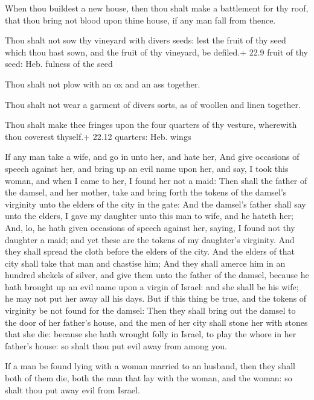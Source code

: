  When thou buildest a new house, then thou shalt make a
battlement for thy roof, that thou bring not blood upon thine house, if
any man fall from thence.

 Thou shalt not sow thy vineyard with divers seeds: lest
the fruit of thy seed which thou hast sown, and the fruit of thy
vineyard, be defiled.+ 22.9 fruit of thy seed: Heb. fulness of the seed

 Thou shalt not plow with an ox and an ass together.

 Thou shalt not wear a garment of divers sorts, as of
woollen and linen together.

 Thou shalt make thee fringes upon the four quarters of
thy vesture, wherewith thou coverest thyself.+ 22.12 quarters: Heb.
wings

 If any man take a wife, and go in unto her, and hate
her,  And give occasions of speech against her, and bring
up an evil name upon her, and say, I took this woman, and when I came to
her, I found her not a maid:  Then shall the father of the
damsel, and her mother, take and bring forth the tokens of the damsel's
virginity unto the elders of the city in the gate:  And the
damsel's father shall say unto the elders, I gave my daughter unto this
man to wife, and he hateth her;  And, lo, he hath given
occasions of speech against her, saying, I found not thy daughter a
maid; and yet these are the tokens of my daughter's virginity. And they
shall spread the cloth before the elders of the city.  And
the elders of that city shall take that man and chastise him;
 And they shall amerce him in an hundred shekels of silver,
and give them unto the father of the damsel, because he hath brought up
an evil name upon a virgin of Israel: and she shall be his wife; he may
not put her away all his days.  But if this thing be true,
and the tokens of virginity be not found for the damsel: 
Then they shall bring out the damsel to the door of her father's house,
and the men of her city shall stone her with stones that she die:
because she hath wrought folly in Israel, to play the whore in her
father's house: so shalt thou put evil away from among you.

 If a man be found lying with a woman married to an
husband, then they shall both of them die, both the man that lay with
the woman, and the woman: so shalt thou put away evil from Israel.

